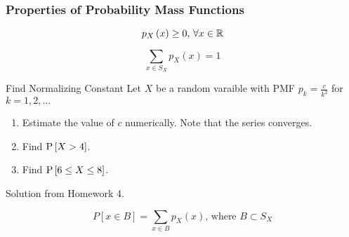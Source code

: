\subsubsection{Properties of Probability Mass Functions}\label{subsubsec:Properties of Probability Mass Functions}
\begin{propertylist}%
\item
  \begin{equation}
    p_{X} \left( x \right) \geq 0 \text{, } \forall x \in \operatorname{\mathbb{R}}
  \end{equation}
\item
  \begin{equation}
    \sum\limits_{x \in S_{X}} p_{X} \left( x \right) = 1
  \end{equation}
\end{propertylist}
\begin{example}[Problem 3.13]{Find Normalizing Constant}
  Let $X$ be a random varaible with PMF $p_{k} = \frac{c}{k^{2}}$ for $k = 1,2,\ldots$
  \begin{enumerate}[label=\textbf{(\alph*)}]
  \item Estimate the value of $c$ numerically. Note that the series converges.
  \item Find $\operatorname{\operatorname{P}} \left[ X > 4 \right]$.
  \item Find $\operatorname{\operatorname{P}} \left[ 6 \leq X \leq 8 \right]$.
  \end{enumerate}

  \tcblower

  Solution from Homework 4.
\end{example}
\begin{propertylist}[resume]
\item
  \begin{equation}
    P \left[ x \in B \right] = \sum\limits_{x \in B} p_{X} \left( x \right) \text{, where } B \subset S_{X}
  \end{equation}
\end{propertylist}

